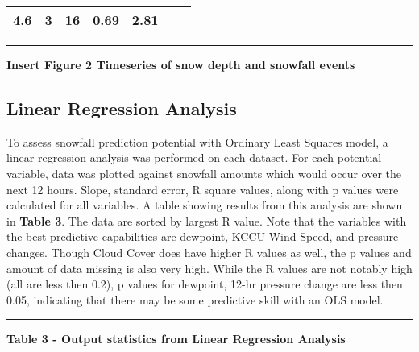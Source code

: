 \documentclass[11pt]{article}
\begin{document}
\begin{longtable}[]{@{}lllllll@{}}
\begin{minipage}[t]{0.06\columnwidth}
4.6\strut
\end{minipage} & \begin{minipage}[t]{0.08\columnwidth}\raggedright\strut
3\strut
\end{minipage} & \begin{minipage}[t]{0.06\columnwidth}\raggedright\strut
16\strut
\end{minipage} & \begin{minipage}[t]{0.16\columnwidth}\raggedright\strut
0.69\strut
\end{minipage} & \begin{minipage}[t]{0.13\columnwidth}\raggedright\strut
2.81\strut
\end{minipage}\tabularnewline
\bottomrule
\end{longtable}

\begin{center}\rule{0.5\linewidth}{\linethickness}\end{center}

\textbf{Insert Figure 2 Timeseries of snow depth and snowfall events}

\subsection{Linear Regression
Analysis}\label{linear-regression-analysis}

To assess snowfall prediction potential with Ordinary Least Squares
model, a linear regression analysis was performed on each dataset. For
each potential variable, data was plotted against snowfall amounts which
would occur over the next 12 hours. Slope, standard error, R square
values, along with p values were calculated for all variables. A table
showing results from this analysis are shown in \textbf{Table 3}. The
data are sorted by largest R value. Note that the variables with the
best predictive capabilities are dewpoint, KCCU Wind Speed, and pressure
changes. Though Cloud Cover does have higher R values as well, the p
values and amount of data missing is also very high. While the R values
are not notably high (all are less then 0.2), p values for dewpoint,
12-hr pressure change are less then 0.05, indicating that there may be
some predictive skill with an OLS model.

\begin{center}\rule{0.5\linewidth}{\linethickness}\end{center}

\textbf{Table 3 - Output statistics from Linear Regression Analysis}
\end{document}
